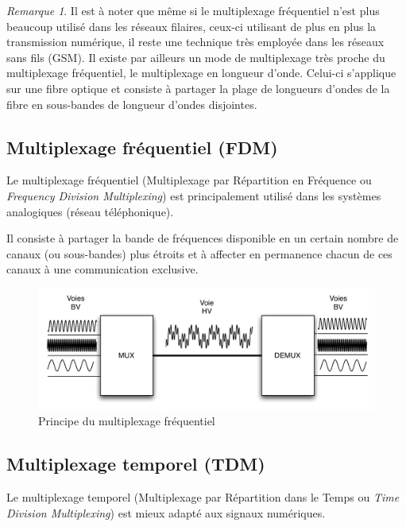 \documentclass[11pt,english,french]{scrreprt}
\theoremstyle{remark}
\newtheorem*{rem*}{Remarque}
\theoremstyle{definition}
\begin{document}
\begin{rem*}
	Il est à noter que même si le multiplexage fréquentiel n’est plus beaucoup utilisé dans les réseaux filaires, ceux-ci utilisant de plus en plus la transmission numérique, il reste une technique très employée dans les réseaux sans fils (GSM).
	Il existe par ailleurs un mode de multiplexage très proche du multiplexage fréquentiel, le
	multiplexage en longueur d’onde. Celui-ci s’applique sur une fibre optique et consiste à partager la plage de longueurs d’ondes de la fibre en sous-bandes de longueur d’ondes disjointes.
\end{rem*}

\subsection{Multiplexage fréquentiel (FDM)} %

Le multiplexage fréquentiel (Multiplexage par Répartition en Fréquence ou \emph{Frequency Division Multiplexing}) est principalement utilisé dans les systèmes analogiques (réseau téléphonique). 

Il consiste à partager la bande de fréquences disponible en un certain nombre de canaux (ou sous-bandes) plus étroits et à affecter en permanence chacun de ces canaux à une communication exclusive.

\begin{figure}[h!]
	\center
	\includegraphics[scale=.75]{graphes/multiplexage-frequentiel}
	\caption{Principe du multiplexage fréquentiel}
\end{figure}

\subsection{Multiplexage temporel (TDM)} %

Le multiplexage temporel (Multiplexage par Répartition dans le Temps ou \emph{Time Division Multiplexing}) est mieux adapté aux signaux numériques. 
\end{document}
